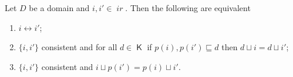 \documentclass[conference]{IEEEtran}
\newcommand{\compact}[1]{\ensuremath{\mathop{\mathsf{K}({#1})}}}
\newcommand{\ir}[1]{\ensuremath{\mathop{\mathit{ir}({#1})}}}
\newcommand{\pred}[1]{\ensuremath{\mathit{p}({#1})}}
\begin{document}
\begin{lemma}
  \label{le:eq-char}
  Let $D$ be a domain and $i, i' \in \ir{D}$.  Then the
  following are equivalent
  \begin{enumerate}
  \item 
    \label{le:eq-char:1}
    $i \leftrightarrow i'$;


  \item 
    \label{le:eq-char:3}
    $\{i, i'\}$ consistent and for all $d \in \compact{D}$
    if $\pred{i}, \pred{i'} \sqsubseteq d$ then
    $d \sqcup i = d \sqcup i'$;

  \item 
    \label{le:eq-char:4}
    $\{i, i'\}$ consistent and $i \sqcup \pred{i'} = \pred{i} \sqcup i'$.
  \end{enumerate}
\end{lemma}
\end{document}
